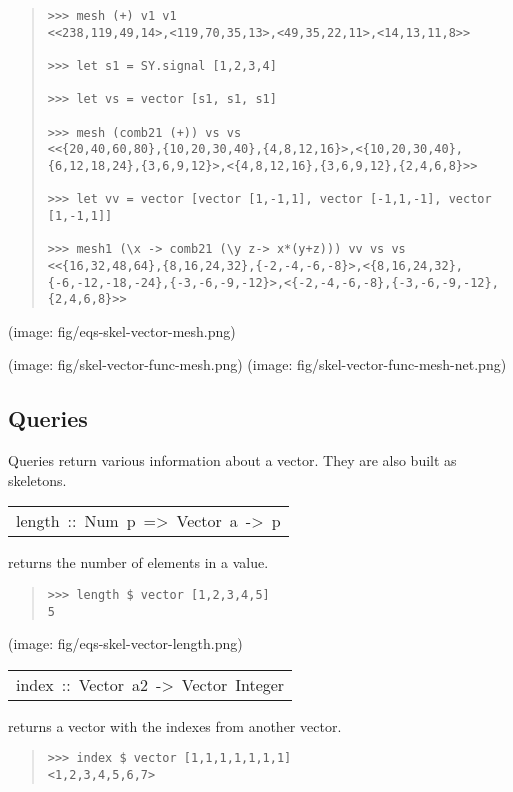 \begin{haddockdesc}
\begin{quote}
{\begin{verbatim}
>>> mesh (+) v1 v1
<<238,119,49,14>,<119,70,35,13>,<49,35,22,11>,<14,13,11,8>>

>>> let s1 = SY.signal [1,2,3,4]

>>> let vs = vector [s1, s1, s1]

>>> mesh (comb21 (+)) vs vs
<<{20,40,60,80},{10,20,30,40},{4,8,12,16}>,<{10,20,30,40},{6,12,18,24},{3,6,9,12}>,<{4,8,12,16},{3,6,9,12},{2,4,6,8}>>

>>> let vv = vector [vector [1,-1,1], vector [-1,1,-1], vector [1,-1,1]]

>>> mesh1 (\x -> comb21 (\y z-> x*(y+z))) vv vs vs
<<{16,32,48,64},{8,16,24,32},{-2,-4,-6,-8}>,<{8,16,24,32},{-6,-12,-18,-24},{-3,-6,-9,-12}>,<{-2,-4,-6,-8},{-3,-6,-9,-12},{2,4,6,8}>>

\end{verbatim}}
\end{quote}(image: fig/eqs-skel-vector-mesh.png)\par
           (image: fig/skel-vector-func-mesh.png)
 (image: fig/skel-vector-func-mesh-net.png)\par
           
\end{haddockdesc}
\subsection{Queries}
Queries return various information about a vector. They are
 also built as skeletons.\par

\begin{haddockdesc}
\item[\begin{tabular}{@{}l}
length\ ::\ Num\ p\ =>\ Vector\ a\ ->\ p
\end{tabular}]\haddockbegindoc
returns the number of elements in a value.\par
\begin{quote}
{\haddockverb\begin{verbatim}
>>> length $ vector [1,2,3,4,5]
5

\end{verbatim}}
\end{quote}(image: fig/eqs-skel-vector-length.png)\par
           
\end{haddockdesc}
\begin{haddockdesc}
\item[\begin{tabular}{@{}l}
index\ ::\ Vector\ a2\ ->\ Vector\ Integer
\end{tabular}]\haddockbegindoc
returns a vector with the indexes from another vector.\par
\begin{quote}
{\haddockverb\begin{verbatim}
>>> index $ vector [1,1,1,1,1,1,1]
<1,2,3,4,5,6,7>

\end{verbatim}}
\end{quote}
\end{haddockdesc}
